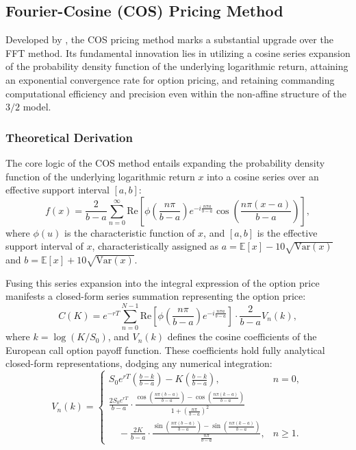 \subsection{Fourier-Cosine (COS) Pricing Method}
Developed by \cite{fangNovelPricingMethod2009}, the COS pricing method marks a substantial upgrade over the FFT method. Its fundamental innovation lies in utilizing a cosine series expansion of the probability density function of the underlying logarithmic return, attaining an exponential convergence rate for option pricing, and retaining commanding computational efficiency and precision even within the non-affine structure of the $3/2$ model.

\subsubsection{Theoretical Derivation}
The core logic of the COS method entails expanding the probability density function of the underlying logarithmic return $x$ into a cosine series over an effective support interval $[a,b]$:
\begin{equation}
f(x) = \frac{2}{b-a} \sum_{n=0}^{\infty} \text{Re} \left[ \phi\left( \frac{n\pi}{b-a} \right) e^{-i \frac{n\pi a}{b-a}} \cos\left( \frac{n\pi (x-a)}{b-a} \right) \right],
\end{equation}
where $\phi(u)$ is the characteristic function of $x$, and $[a,b]$ is the effective support interval of $x$, characteristically assigned as $a = \mathbb{E}[x] - 10\sqrt{\mathrm{Var}(x)}$ and $b = \mathbb{E}[x] + 10\sqrt{\mathrm{Var}(x)}$.

Fusing this series expansion into the integral expression of the option price manifests a closed-form series summation representing the option price:
\begin{equation}
  C(K) = e^{-rT} \sum_{n=0}^{N-1} \text{Re}\left[ \phi\left( \frac{n\pi}{b-a} \right) e^{-i \frac{n\pi a}{b-a}} \right] \cdot \frac{2}{b-a} V_n(k),
\end{equation}
where $k = \log(K/S_0)$, and $V_n(k)$ defines the cosine coefficients of the European call option payoff function. These coefficients hold fully analytical closed-form representations, dodging any numerical integration:
\begin{equation}
V_n(k) =
\begin{cases}
S_0 e^{rT} \left( \frac{b - k}{b - a} \right) - K \left( \frac{b - k}{b - a} \right), & n = 0, \\[10pt]
\frac{2 S_0 e^{rT}}{b - a} \cdot \frac{\cos\left( \frac{n\pi (b - a)}{b - a} \right) - \cos\left( \frac{n\pi (k - a)}{b - a} \right)}{1 + \left( \frac{n\pi}{b - a} \right)^2} \\
\quad - \frac{2 K}{b - a} \cdot \frac{\sin\left( \frac{n\pi (b - a)}{b - a} \right) - \sin\left( \frac{n\pi (k - a)}{b - a} \right)}{\frac{n\pi}{b - a}}, & n \geq 1.
\end{cases}
\end{equation}

